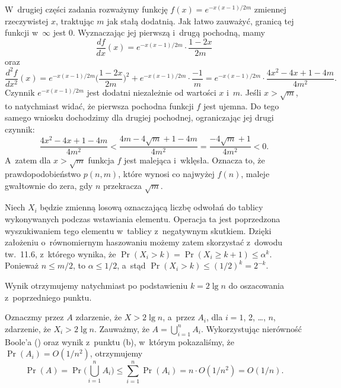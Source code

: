 W~drugiej części zadania rozważymy funkcję $f(x)=e^{-x(x-1)/2m}$ zmiennej rzeczywistej $x$, traktując $m$ jak stałą dodatnią.
Jak łatwo zauważyć, granicą tej funkcji w~$\infty$ jest 0.
Wyznaczając jej pierwszą i~drugą pochodną, mamy
\[
	\frac{df}{dx}(x) = e^{-x(x-1)/2m}\cdot\frac{1-2x}{2m}
\]
oraz
\[
	\frac{d^2\!f}{dx^2}(x) = e^{-x(x-1)/2m}\biggl(\frac{1-2x}{2m}\biggr)^2+e^{-x(x-1)/2m}\cdot\frac{-1}{m} = e^{-x(x-1)/2m}\cdot\frac{4x^2-4x+1-4m}{4m^2}.
\]
Czynnik $e^{-x(x-1)/2m}$ jest dodatni niezależnie od wartości $x$ i~$m$.
Jeśli $x>\sqrt{m}$, to natychmiast widać, że pierwsza pochodna funkcji $f$ jest ujemna.
Do tego samego wniosku dochodzimy dla drugiej pochodnej, ograniczając jej drugi czynnik:
\[
	\frac{4x^2-4x+1-4m}{4m^2} < \frac{4m-4\sqrt{m}+1-4m}{4m^2} = \frac{-4\sqrt{m}+1}{4m^2} < 0.
\]
A~zatem dla $x>\sqrt{m}$ funkcja $f$ jest malejąca i~wklęsła.
Oznacza to, że prawdopodobieństwo $p(n,m)$, które wynosi co najwyżej $f(n)$, maleje gwałtownie do zera, gdy $n$ przekracza $\sqrt{m}$.

\problems


\subproblem %
Niech $X_i$ będzie zmienną losową oznaczającą liczbę odwołań do tablicy wykonywanych podczas wstawiania  elementu.
Operacja ta jest poprzedzona wyszukiwaniem tego elementu w~tablicy z~negatywnym skutkiem.
Dzięki założeniu o~równomiernym haszowaniu możemy zatem skorzystać z~dowodu tw.\ 11.6, z~którego wynika, że $\Pr(X_i>k)=\Pr(X_i\ge k+1)\le\alpha^k$.
Ponieważ $n\le m/2$, to $\alpha\le1/2$, a~stąd $\Pr(X_i>k)\le(1/2)^k=2^{-k}$.

\subproblem %
Wynik otrzymujemy natychmiast po podstawieniu $k=2\lg n$ do oszacowania z~poprzedniego punktu.

\subproblem %
Oznaczmy przez $A$ zdarzenie, że $X>2\lg n$, a~przez $A_i$, dla $i=1$, 2, \dots, $n$, zdarzenie, że $X_i>2\lg n$.
Zauważmy, że $A=\bigcup_{i=1}^nA_i$.
Wykorzystując nierówność Boole'a () oraz wynik z~punktu (b), w~którym pokazaliśmy, że $\Pr(A_i)=O(1/n^2)$, otrzymujemy
\[
	\Pr(A) = \Pr\biggl(\bigcup_{i=1}^nA_i\biggr) \le \sum_{i=1}^n\Pr(A_i) = n\cdot O(1/n^2) = O(1/n).
\]


